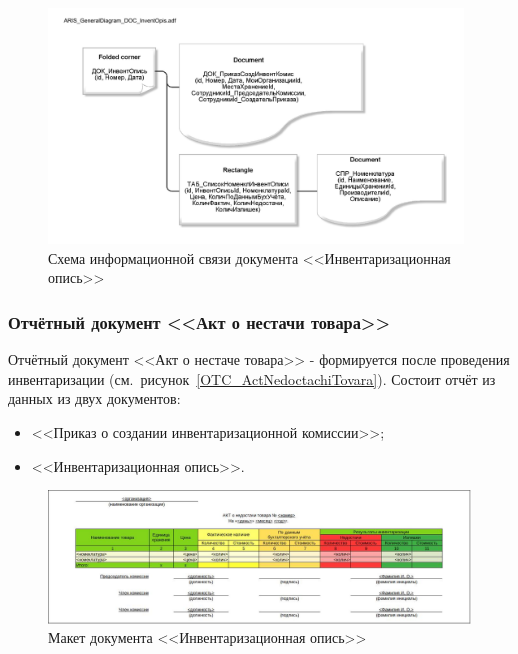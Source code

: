 \begin{figure}[!h]
    \centering

    \includegraphics[width=11cm]
    {assets/ARIS/ARIS_GeneralDiagram_DOC_InventOpis.adf.pdf}

    \caption{Схема информационной связи документа <<Инвентаризационная опись>>}

    \label{fig:ARIS_GeneralDiagram_DOC_InventOpis}
\end{figure}

\newpage
\subsubsection{Отчётный документ <<Акт о нестачи товара>>}

Отчётный документ <<Акт о нестаче товара>>
- формируется после проведения инвентаризации (см.~рисунок~\ref{OTC_ActNedoctachiTovara}).
Состоит отчёт из данных из двух документов:
\begin{itemize}
    \item <<Приказ о создании инвентаризационной комиссии>>;
    \item <<Инвентаризационная опись>>.
\end{itemize}

\begin{figure}[!h]
    \centering

    \includegraphics[width=17cm]
    {assets/layouts/OTC_ActNedoctachiTovara.jpg}

    \caption{Макет документа <<Инвентаризационная опись>>}
    
    \label{fig:OTC_ActNedoctachiTovara}
\end{figure}

